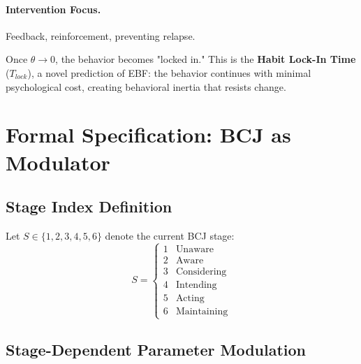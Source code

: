 \paragraph{Intervention Focus.}
Feedback, reinforcement, preventing relapse.

\begin{intuition}
Once $\theta \to 0$, the behavior becomes "locked in." This is the
\textbf{Habit Lock-In Time} ($T_{lock}$), a novel prediction of EBF:
the behavior continues with minimal psychological cost, creating behavioral
inertia that resists change.
\end{intuition}



\section{Formal Specification: BCJ as Modulator}
\label{sec:bcj-formal}


\subsection{Stage Index Definition}

\begin{definition}
Let $S \in \{1, 2, 3, 4, 5, 6\}$ denote the current BCJ stage:
\begin{equation}
S = \begin{cases}
1 & \text{Unaware} \\
2 & \text{Aware} \\
3 & \text{Considering} \\
4 & \text{Intending} \\
5 & \text{Acting} \\
6 & \text{Maintaining}
\end{cases}
\label{eq:bcj-stage-index}
\end{equation}
\end{definition}

\subsection{Stage-Dependent Parameter Modulation}


